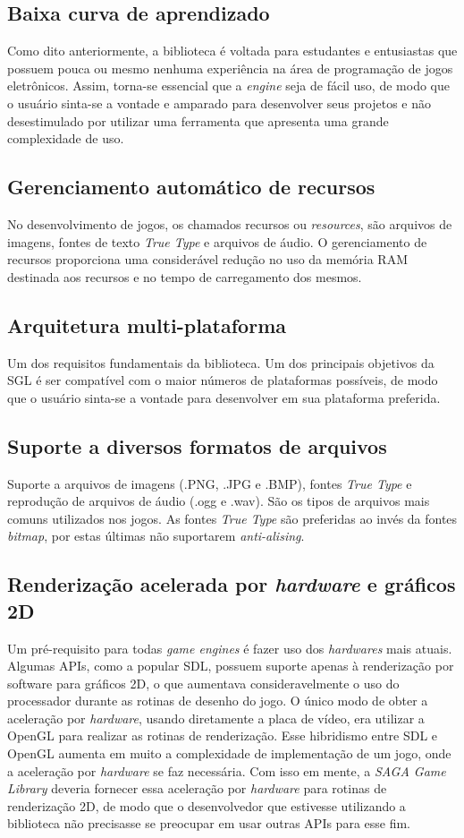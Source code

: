 \subsection{Baixa curva de aprendizado}
%
Como dito anteriormente, a biblioteca é voltada para estudantes e entusiastas que possuem pouca ou mesmo nenhuma experiência na área de programação de jogos eletrônicos. Assim, torna-se essencial que a \textit{engine} seja de fácil uso, de modo que o usuário sinta-se a vontade e amparado para desenvolver seus projetos e não desestimulado por utilizar uma ferramenta que apresenta uma grande complexidade de uso.
%
\subsection{Gerenciamento automático de recursos}
%
No desenvolvimento de jogos, os chamados recursos ou \textit{resources}, são arquivos de imagens, fontes de texto \textit{True Type} e arquivos de áudio. O gerenciamento de recursos proporciona uma considerável redução no uso da memória RAM destinada aos recursos e no tempo de carregamento dos mesmos.
%
\subsection{Arquitetura multi-plataforma}
%
Um dos requisitos fundamentais da biblioteca. Um dos principais objetivos da SGL é ser compatível com o maior números de plataformas possíveis, de modo que o usuário sinta-se a vontade para desenvolver em sua plataforma preferida.
%
\subsection{Suporte a diversos formatos de arquivos}
%
Suporte a arquivos de imagens (.PNG, .JPG e .BMP), fontes \textit{True Type} e reprodução de arquivos de áudio (.ogg e .wav). São os tipos de arquivos mais comuns utilizados nos jogos. As fontes \textit{True Type} são preferidas ao invés da fontes \textit{bitmap}, por estas últimas não suportarem \textit{anti-alising}. 
%
\subsection{Renderização acelerada por \textit{hardware} e gráficos 2D}
%
Um pré-requisito para todas \textit{game engines} é fazer uso dos \textit{hardwares} mais atuais. Algumas APIs, como a popular SDL, possuem suporte apenas à renderização por software para gráficos 2D, o que aumentava consideravelmente o uso do processador durante as rotinas de desenho do jogo. O único modo de obter a aceleração por \textit{hardware}, usando diretamente a placa de vídeo, era utilizar a OpenGL para realizar as rotinas de renderização. Esse hibridismo entre SDL e OpenGL aumenta em muito a complexidade de implementação de um jogo, onde a aceleração por \textit{hardware} se faz necessária. Com isso em mente, a \textit{SAGA Game Library} deveria fornecer essa aceleração por \textit{hardware} para rotinas de renderização 2D, de modo que o desenvolvedor que estivesse utilizando a biblioteca não precisasse se preocupar em usar outras APIs para esse fim.
%
